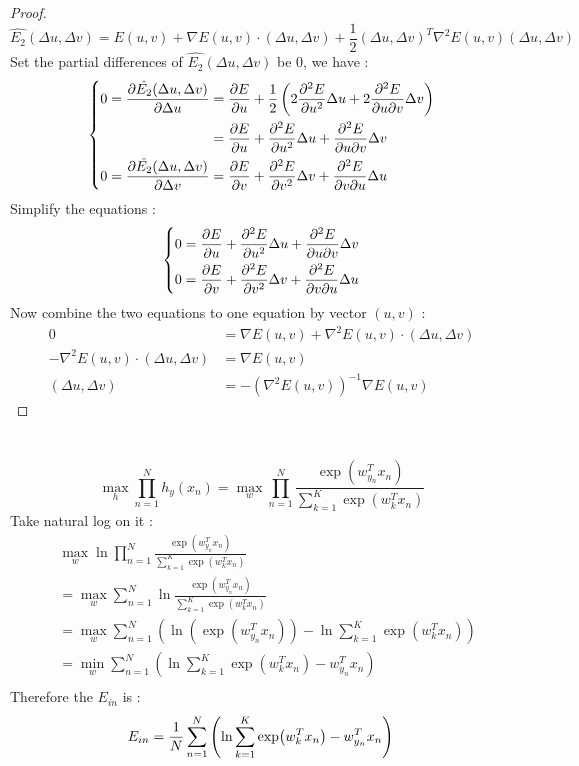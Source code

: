 \documentclass[12pt,a4paper]{article}
\theoremstyle{remark}
\begin{document}
\section{} %
\begin{proof}
	\[
		\hat{{E}_2}(\Delta u,\Delta v)
			= E(u, v) + \nabla E(u, v) \cdot (\Delta u, \Delta v)
			+ \frac{1}{2} {(\Delta u, \Delta v)}^{T} {\nabla}^{2}E(u, v) (\Delta u, \Delta v)
	\]
	Set the partial differences of $\hat{{E}_2}(\Delta u,\Delta v)$ be $0$, we have :
	\[
		\left\{
			\begin{aligned}
				0 = \pdv{\hat{{E}_2}(\Delta u,\Delta v)}{\Delta u}
					&= \pdv{E}{u} + \frac{1}{2}\left( 2 \pdv[2]{E}{u} \Delta u + 2 \pdv{E}{u}{v} \Delta v \right) \\
					&= \pdv{E}{u} + \pdv[2]{E}{u} \Delta u + \pdv{E}{u}{v} \Delta v \\
				0 = \pdv{\hat{{E}_2}(\Delta u,\Delta v)}{\Delta v}
					&= \pdv{E}{v} + \pdv[2]{E}{v} \Delta v + \pdv{E}{v}{u} \Delta u \\
			\end{aligned}
		\right.
	\]
	Simplify the equations :
	\[
		\left\{
			\begin{aligned}
				0 &= \pdv{E}{u} + \pdv[2]{E}{u} \Delta u + \pdv{E}{u}{v} \Delta v \\
				0 &= \pdv{E}{v} + \pdv[2]{E}{v} \Delta v + \pdv{E}{v}{u} \Delta u \\
			\end{aligned}
		\right.
	\]
	Now combine the two equations to one equation by vector $(u, v)$ :
	\[
		\begin{aligned}
			0 &= \nabla E(u, v) + {\nabla}^{2} E(u, v) \cdot (\Delta u, \Delta v) \\
			- {\nabla}^{2} E(u, v) \cdot (\Delta u, \Delta v) &= \nabla E(u, v) \\
			(\Delta u, \Delta v) &= - {\left({\nabla}^{2} E(u, v)\right)}^{-1} \nabla E(u, v)
		\end{aligned}
	\]
\end{proof}
\section{} %
\[
		\max_{h} \prod_{n=1}^{N} h_{y}\left(x_{n}\right) 
		= \max_{w} \prod_{n=1}^{N}
			\frac{\exp({w}_{y_{n}}^{T}x_{n})}{\sum_{k=1}^{K} \exp({w}_{k}^{T}x_{n})}
\]
Take natural log on it :
\[
	\begin{aligned}
		& \max_{w} \ln \prod_{n=1}^{N}
			\frac{\exp({w}_{y_{n}}^{T}x_{n})}{\sum_{k=1}^{K} \exp({w}_{k}^{T}x_{n})} \\
		&= \max_{w} \sum_{n=1}^{N} \ln
			\frac{\exp({w}_{y_{n}}^{T}x_{n})}{\sum_{k=1}^{K} \exp({w}_{k}^{T}x_{n})} \\
		&= \max_{w} \sum_{n=1}^{N} \left( \ln( \exp({w}_{y_{n}}^{T}x_{n}) ) -
			\ln\sum_{k=1}^{K} \exp({w}_{k}^{T}x_{n}) \right) \\
		&= \min_{w} \sum_{n=1}^{N} \left( \ln\sum_{k=1}^{K} \exp({w}_{k}^{T}x_{n}) -
			{w}_{y_{n}}^{T}x_{n} \right) \\
	\end{aligned}
\]
Therefore the $E_{in}$ is :
\[
	E_{in} = \frac{1}{N} \sum_{n=1}^{N} \left( \ln \sum_{k=1}^{K} \exp({w}_{k}^{T}x_{n}) -
		{w}_{y_{n}}^{T}x_{n} \right) \\
\]
\end{document}
